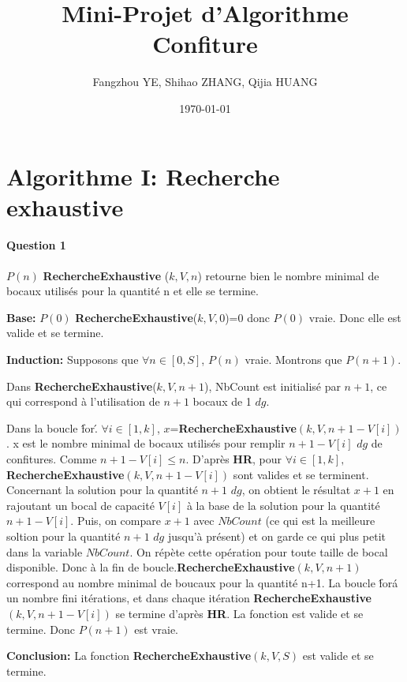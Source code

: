 \documentclass{article}
\title{Mini-Projet d'Algorithme
 \\Confiture}
\author{Fangzhou YE, Shihao ZHANG, Qijia HUANG}
\date{\today}
\begin{document}
\maketitle
\newpage
\tableofcontents
\listofalgorithms
\newpage
\section{Algorithme I: Recherche exhaustive}
\paragraph{Question 1}
$P(n)$ \textbf{RechercheExhaustive} ($k, V, n$) retourne bien le nombre minimal de bocaux utilisés pour la quantité n et elle se termine.

\textbf{Base:} $P(0)$
\textbf{RechercheExhaustive}($k, V, 0$)=0 donc $P(0)$ vraie. Donc elle est valide et se termine.

\textbf{Induction:} 
Supposons que $\forall n \in [0,S]$, $P(n)$ vraie. Montrons que $P(n+1)$.

Dans \textbf{RechercheExhaustive}($k, V, n+1$), NbCount est initialisé par $n+1$, ce qui correspond à l'utilisation de $n+1$ bocaux de 1 $dg$.

Dans la boucle \'for\'. $\forall i \in [1,k]$, $x$=\textbf{RechercheExhaustive}$(k, V, n+1-V[i])$. x est le nombre minimal de bocaux utilisés pour remplir $n+1-V[i]$  $dg$ de confitures. Comme $n+1-V[i] \leq n$. D'après \textbf{HR}, pour $\forall i \in [1,k], $ \textbf{RechercheExhaustive}$(k, V, n+1-V[i])$ sont valides et se terminent.
Concernant la solution pour la quantité $n+1$ $dg$, on obtient le résultat $x+1$ en rajoutant un bocal de capacité $V[i]$ à la base de la solution pour la quantité $n+1-V[i]$. Puis, on compare $x+1$ avec $NbCount$ (ce qui est la meilleure soltion pour la quantité $n+1$ $dg$ jusqu'à présent) et on garde ce qui plus petit dans la variable $NbCount$. On répète cette opération pour toute taille de bocal disponible. Donc à la fin de boucle.\textbf{RechercheExhaustive}$(k, V, n+1)$ correspond au nombre minimal de boucaux pour la quantité n+1.  La boucle \'for\' a un nombre fini itérations, et dans chaque itération \textbf{RechercheExhaustive$(k, V, n+1-V[i])$} se termine d'après \textbf{HR}. La fonction est valide et se termine. Donc $P(n+1)$ est vraie.

\textbf{Conclusion: }
La fonction \textbf{RechercheExhaustive$(k, V, S)$} est valide et se termine.
\end{document}
